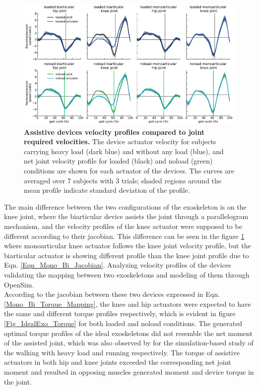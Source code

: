 \documentclass[10pt,letterpaper]{article}
\begin{document}
\begin{figure}[ht]   
	\centering
	\includegraphics[width=\linewidth]{Ideal_Exo_MonovsBi_Figures/PaperFigure_Exoskeletons_Speed.pdf}
	\vspace{1mm}
	\caption{{\small\textbf{Assistive devices velocity profiles compared to joint required velocities.} The device actuator velocity for subjects carrying heavy load (dark blue) and without any load (blue), and net joint velocity profile for loaded (black) and noload (green) conditions are shown for each actuator of the devices. The curves are averaged over 7 subjects with 3 trials; shaded regions around the mean profile indicate standard deviation of the profile.}}
	\label{Fig_IdealExo_Speed}
\end{figure}
The main difference between the two configurations of the exoskeleton is on the knee joint, where the biarticular device assists the joint through a parallelogram mechanism, and the velocity profiles of the knee actuator were supposed to be different according to their jacobian. This difference can be seen in the figure \ref{Fig_IdealExo_Speed} where monoarticular knee actuator follows the knee joint velocity profile, but the biarticular actuator is showing different profile than the knee joint profile due to Eqn. \ref{Eqn_Mono_Bi_Jacobian}. Analyzing velocity profiles of the devices validating the mapping between two exoskeletons and modeling of them through OpenSim.\\
According to the jacobian between these two devices expressed in Eqn. \ref{Mono_Bi_Torque_Mapping}, the knee and hip actuators were expected to have the same and different torque profiles respectively, which is evident in figure \ref{Fig_IdealExo_Torque} for both loaded and noload conditions. The generated optimal torque profiles of the ideal exoskeletons did not resemble the net moment of the assisted joint, which was also observed by \cite{93,2} for the simulation-based study of the walking with heavy load and running respectively. The torque of assistive actuators in both hip and knee joints exceeded the corresponding net joint moment and resulted in opposing muscles generated moment and device torque in the joint.\\
\end{document}
